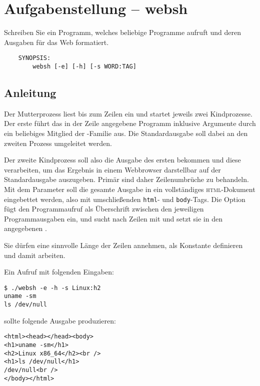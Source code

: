 




\section*{Aufgabenstellung -- websh}

Schreiben Sie ein Programm, welches beliebige Programme aufruft und
deren Ausgaben für das Web formatiert.

\begin{verbatim}
    SYNOPSIS:
        websh [-e] [-h] [-s WORD:TAG]
\end{verbatim}

\subsection*{Anleitung}

Der Mutterprozess liest bis zum  Zeilen ein und startet
jeweils zwei Kindprozesse. Der erste führt das in der Zeile angegebene
Programm inklusive Argumente durch ein beliebiges Mitglied der
-Familie aus. Die Standardausgabe soll dabei an den zweiten
Prozess umgeleitet werden.

Der zweite Kindprozess soll also die Ausgabe des ersten bekommen und
diese verarbeiten, um das Ergebnis in einem Webbrowser darstellbar auf
der Standardausgabe auszugeben. Primär sind daher Zeilenumbrüche zu
behandeln. Mit dem Parameter  soll die gesamte Ausgabe in ein
vollständiges \textsc{html}-Dokument eingebettet werden, also mit
umschließenden \verb_html_- und \verb_body_-Tags. Die Option 
fügt den Programmaufruf als Überschrift zwischen den jeweiligen
Programmausgaben ein, und  sucht nach Zeilen mit 
und setzt sie in den angegebenen .

Sie dürfen eine sinnvolle Länge der Zeilen annehmen, als Konstante
definieren und damit arbeiten.

Ein Aufruf mit folgenden Eingaben:

\begin{verbatim}
$ ./websh -e -h -s Linux:h2
uname -sm
ls /dev/null
\end{verbatim}

sollte folgende Ausgabe produzieren:

\begin{verbatim}
<html><head></head><body>
<h1>uname -sm</h1>
<h2>Linux x86_64</h2><br />
<h1>ls /dev/null</h1>
/dev/null<br />
</body></html>
\end{verbatim}

\osueguidelinestwo


